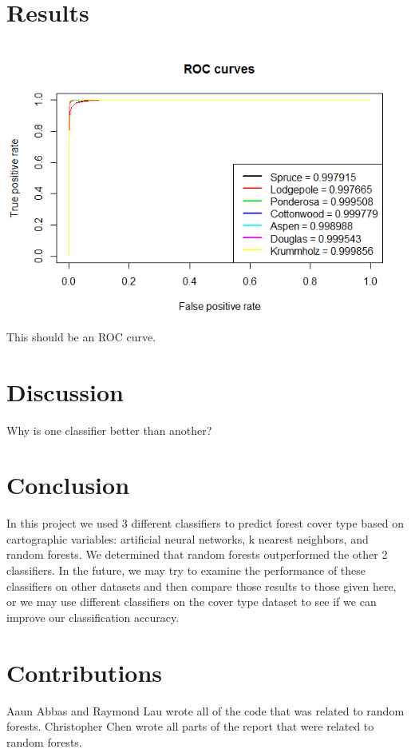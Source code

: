 \documentclass[11pt]{article}
\begin{document}
\section{Results}
\includegraphics[width=\linewidth]{images/RFROC.png}
This should be an ROC curve.

\section{Discussion}
Why is one classifier better than another?

\section{Conclusion}
In this project we used 3 different classifiers to predict forest cover type based on cartographic variables: artificial neural networks, k nearest neighbors, and random forests. We determined that random forests outperformed the other 2 classifiers. In the future, we may try to examine the performance of these classifiers on other datasets and then compare those results to those given here, or we may use different classifiers on the cover type dataset to see if we can improve our classification accuracy.

\section{Contributions}
Aaun Abbas and Raymond Lau wrote all of the code that was related to random forests. Christopher Chen wrote all parts of the report that were related to random forests.
\end{document}
